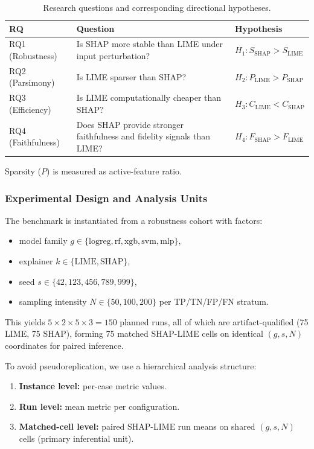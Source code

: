 \documentclass[fleqn,10pt,lineno]{wlpeerj}
\begin{document}
\begin{table}[h]
\centering
\caption{Research questions and corresponding directional hypotheses.}
\label{tab:rqs}
\begin{tabularx}{\linewidth}{p{2.1cm} X l}
\toprule
\textbf{RQ} & \textbf{Question} & \textbf{Hypothesis} \\
\midrule
RQ1 (Robustness) & Is SHAP more stable than LIME under input perturbation? & $H_1: S_{\mathrm{SHAP}} > S_{\mathrm{LIME}}$ \\
RQ2 (Parsimony) & Is LIME sparser than SHAP? & $H_2: P_{\mathrm{LIME}} > P_{\mathrm{SHAP}}$ \\
RQ3 (Efficiency) & Is LIME computationally cheaper than SHAP? & $H_3: C_{\mathrm{LIME}} < C_{\mathrm{SHAP}}$ \\
RQ4 (Faithfulness) & Does SHAP provide stronger faithfulness and fidelity signals than LIME? & $H_4: F_{\mathrm{SHAP}} > F_{\mathrm{LIME}}$ \\
\bottomrule
\end{tabularx}
\end{table}
Sparsity ($P$) is measured as active-feature ratio.

\subsubsection{Experimental Design and Analysis Units}
\label{sec:design}

The benchmark is instantiated from a robustness cohort with factors:
\begin{itemize}[leftmargin=*]
\item model family $g \in \{\mathrm{logreg}, \mathrm{rf}, \mathrm{xgb},
\mathrm{svm}, \mathrm{mlp}\}$,
\item explainer $k \in \{\mathrm{LIME}, \mathrm{SHAP}\}$,
\item seed $s \in \{42, 123, 456, 789, 999\}$,
\item sampling intensity $N \in \{50, 100, 200\}$ per TP/TN/FP/FN stratum.
\end{itemize}

This yields $5 \times 2 \times 5 \times 3 = 150$ planned runs, all of
which are artifact-qualified (75 LIME, 75 SHAP), forming 75 matched
SHAP-LIME cells on identical $(g, s, N)$ coordinates for paired inference.

To avoid pseudoreplication, we use a hierarchical analysis structure:
\begin{enumerate}[leftmargin=*]
\item \textbf{Instance level:} per-case metric values.
\item \textbf{Run level:} mean metric per configuration.
\item \textbf{Matched-cell level:} paired SHAP-LIME run means on shared
$(g, s, N)$ cells (primary inferential unit).
\end{enumerate}
\end{document}
